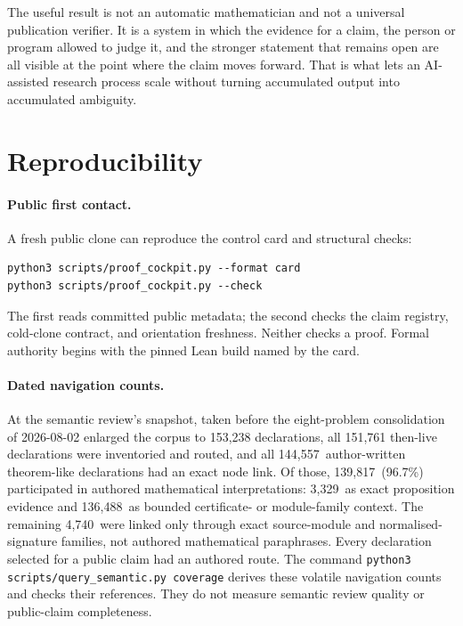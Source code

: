 \documentclass[10pt]{article}
\newcommand{\SemanticAuthoredTheoremLike}{144,557}
\newcommand{\SemanticAuthoredInterpreted}{139,817}
\newcommand{\SemanticDirectEvidence}{3,329}
\newcommand{\SemanticContextual}{136,488}
\newcommand{\SemanticStructuralOnly}{4,740}
\newcommand{\SemanticAuthoredPercent}{96.7}
\begin{document}
The useful result is not an automatic mathematician and not a universal
publication verifier. It is a system in which the evidence for a claim, the
person or program allowed to judge it, and the stronger statement that remains
open are all visible at the point where the claim moves forward. That is what
lets an AI-assisted research process scale without turning accumulated output
into accumulated ambiguity.

\appendix
\small
\section{Reproducibility}\label{app:repro}

\paragraph{Public first contact.}
A fresh public clone can reproduce the control card and structural checks:
\begin{verbatim}
python3 scripts/proof_cockpit.py --format card
python3 scripts/proof_cockpit.py --check
\end{verbatim}
The first reads committed public metadata; the second checks the claim
registry, cold-clone contract, and orientation freshness.  Neither checks a
proof.  Formal authority begins with the pinned Lean build named by the card.

\paragraph{Dated navigation counts.}
At the semantic review's snapshot, taken before the eight-problem
consolidation of 2026-08-02 enlarged the corpus to 153,238 declarations, all
151,761 then-live declarations were inventoried and routed, and all
\SemanticAuthoredTheoremLike\ author-written theorem-like
declarations had an exact node link.  Of those,
\SemanticAuthoredInterpreted\ (\SemanticAuthoredPercent\%) participated in
authored mathematical interpretations: \SemanticDirectEvidence\ as exact
proposition evidence and \SemanticContextual\ as bounded certificate- or
module-family context.  The remaining \SemanticStructuralOnly\ were linked only
through exact source-module and normalised-signature families, not authored
mathematical paraphrases.  Every declaration selected for a public claim had
an authored route.  The command
\texttt{python3 scripts/query\_semantic.py coverage} derives these volatile
navigation counts and checks their references.  They do not measure semantic
review quality or public-claim completeness.
\end{document}
